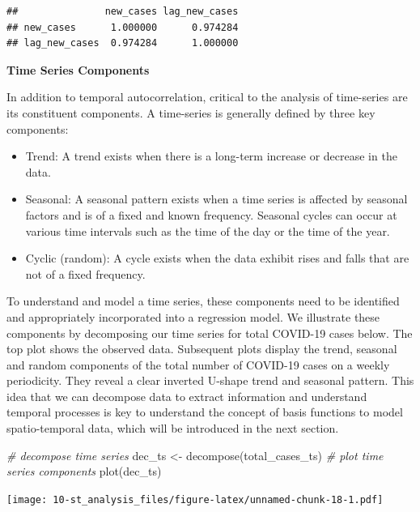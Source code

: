 \documentclass[
]{book}
\newenvironment{Shaded}{\begin{snugshade}}{\end{snugshade}}
\newcommand{\CommentTok}[1]{\textcolor[rgb]{0.56,0.35,0.01}{\textit{#1}}}
\newcommand{\FunctionTok}[1]{\textcolor[rgb]{0.00,0.00,0.00}{#1}}
\newcommand{\NormalTok}[1]{#1}
\newcommand{\OtherTok}[1]{\textcolor[rgb]{0.56,0.35,0.01}{#1}}
\begin{document}
\begin{verbatim}
##               new_cases lag_new_cases
## new_cases      1.000000      0.974284
## lag_new_cases  0.974284      1.000000
\end{verbatim}

\textbf{Time Series Components}

In addition to temporal autocorrelation, critical to the analysis of time-series are its constituent components. A time-series is generally defined by three key components:

\begin{itemize}
\item
  Trend: A trend exists when there is a long-term increase or decrease in the data.
\item
  Seasonal: A seasonal pattern exists when a time series is affected by seasonal factors and is of a fixed and known frequency. Seasonal cycles can occur at various time intervals such as the time of the day or the time of the year.
\item
  Cyclic (random): A cycle exists when the data exhibit rises and falls that are not of a fixed frequency.
\end{itemize}

To understand and model a time series, these components need to be identified and appropriately incorporated into a regression model. We illustrate these components by decomposing our time series for total COVID-19 cases below. The top plot shows the observed data. Subsequent plots display the trend, seasonal and random components of the total number of COVID-19 cases on a weekly periodicity. They reveal a clear inverted U-shape trend and seasonal pattern. This idea that we can decompose data to extract information and understand temporal processes is key to understand the concept of basis functions to model spatio-temporal data, which will be introduced in the next section.

\begin{Shaded}
\begin{Highlighting}[]
\CommentTok{\# decompose time series}
\NormalTok{dec\_ts }\OtherTok{\textless{}{-}} \FunctionTok{decompose}\NormalTok{(total\_cases\_ts)}
\CommentTok{\# plot time series components}
\FunctionTok{plot}\NormalTok{(dec\_ts)}
\end{Highlighting}
\end{Shaded}

\texttt{[image: 10-st\_analysis\_files/figure-latex/unnamed-chunk-18-1.pdf]}
\end{document}
